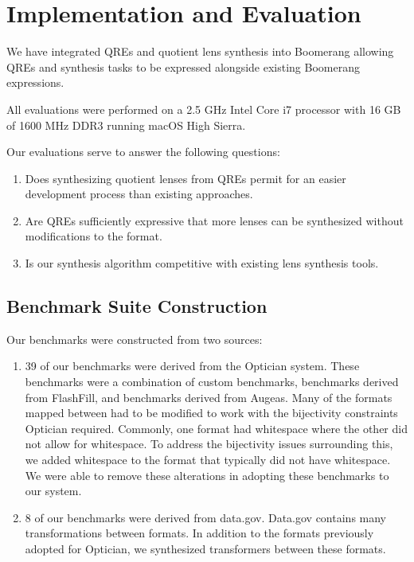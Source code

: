 \documentclass{svproc}
\begin{document}
\section{Implementation and Evaluation}
\label{impl}


We have integrated QREs and quotient lens synthesis into Boomerang allowing QREs
and synthesis tasks to be expressed alongside existing Boomerang expressions.

All evaluations were performed on a 2.5 GHz Intel Core i7 processor with 16 GB
of 1600 MHz DDR3 running macOS High Sierra.

Our evaluations serve to answer the following questions:
\begin{enumerate}
\item Does synthesizing quotient lenses from QREs permit for an easier
  development process than existing approaches.

\item Are QREs sufficiently expressive that more lenses can be synthesized
  without modifications to the format. 

\item Is our synthesis algorithm competitive with existing lens synthesis
  tools.
\end{enumerate}

\subsection{Benchmark Suite Construction} 
Our benchmarks were constructed from two sources:
\begin{enumerate}
\item 39 of our benchmarks were derived from the Optician system.  These
  benchmarks were a combination of custom benchmarks, benchmarks derived from
  FlashFill, and benchmarks derived from Augeas.  Many of the formats mapped
  between had to be modified to work with the bijectivity constraints
  Optician required.  Commonly, one format had whitespace where the other did
  not allow for whitespace.  To address the bijectivity issues surrounding this,
  we added whitespace to the format that typically did not have whitespace.  We
  were able to remove these alterations in adopting these benchmarks to our
  system.

\item 8 of our benchmarks were derived from data.gov.  Data.gov contains
  many transformations between formats.  In addition to the formats previously
  adopted for Optician, we synthesized transformers between these formats.
\end{enumerate}
\end{document}
